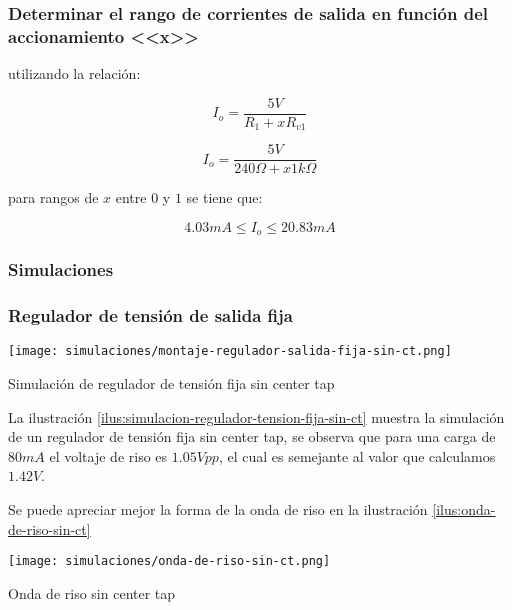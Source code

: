 \subsubsection*{Determinar el rango de corrientes de salida en función del accionamiento <<x>>}

utilizando la relación:

\begin{equation}
    I_o = \frac{5V}{R_1 + xR_{v1}}
\end{equation}

\begin{equation}
    I_o = \frac{5V}{240 \Omega + x 1k \Omega}
\end{equation}

para rangos de $x$ entre $0$ y $1$ se tiene que:

\begin{equation*}
    4.03 mA \leq I_o \leq 20.83 mA 
\end{equation*}

\subsubsection{Simulaciones}

\subsubsection*{Regulador de tensión de salida fija}

\begin{ilustracion}[ht]
    \centering
    \texttt{[image: simulaciones/montaje-regulador-salida-fija-sin-ct.png]}
    \caption{Simulación de regulador de tensión fija sin center tap}
    \label{ilus:simulacion-regulador-tension-fija-sin-ct}
\end{ilustracion}

La ilustración \ref{ilus:simulacion-regulador-tension-fija-sin-ct} muestra la simulación de un regulador de tensión fija sin center tap, se observa que para una carga de $80mA$ el voltaje de riso es $1.05 Vpp$, el cual es semejante al valor que calculamos $1.42 V$.

Se puede apreciar mejor la forma de la onda de riso en la ilustración \ref{ilus:onda-de-riso-sin-ct} 

\begin{ilustracion}[ht]
    \centering
    \texttt{[image: simulaciones/onda-de-riso-sin-ct.png]}
    \caption{Onda de riso sin center tap}
    \label{ilus:onda-de-riso-sin-ct}
\end{ilustracion}

